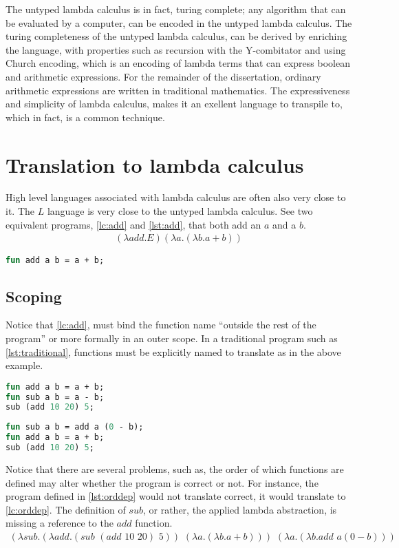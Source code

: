 \documentclass[11pt,oneside,a4paper]{report}
\begin{document}
The untyped lambda calculus is in fact, turing complete; any algorithm that can be evaluated by a computer, can be encoded in the untyped lambda calculus.
The turing completeness of the untyped lambda calculus, can be derived by enriching the language, with properties such as recursion with the Y-combitator and using Church encoding, which is an encoding of lambda terms that can express boolean and arithmetic expressions\cite{church1985calculi}.
For the remainder of the dissertation, ordinary arithmetic expressions are written in traditional mathematics.
The expressiveness and simplicity of lambda calculus, makes it an exellent language to transpile to, which in fact, is a common technique.

\section{Translation to lambda calculus}
High level languages associated with lambda calculus are often also very close to it.
The $L$ language is very close to the untyped lambda calculus.
See two equivalent programs, \autoref{lc:add} and \autoref{lst:add}, that both add an $a$ and a $b$.
\begin{align}
(\lambda add . E)(\lambda a . (\lambda b . a + b))
\label{lc:add}
\end{align}
\begin{lstlisting}[language=ML,caption={Add function},label={lst:add},xleftmargin=.35\textwidth]
fun add a b = a + b;
\end{lstlisting}

\subsection{Scoping}
Notice that \autoref{lc:add}, must bind the function name ``outside the rest of the program'' or more formally in an outer scope.
In a traditional program such as \autoref{lst:traditional}, functions must be explicitly named to translate as in the above example.
\begin{lstlisting}[language=ML,caption={A traditional program},label={lst:traditional},xleftmargin=.32\textwidth]
fun add a b = a + b;
fun sub a b = a - b;
sub (add 10 20) 5;
\end{lstlisting}
\begin{lstlisting}[language=ML,caption={An order dependant program},label={lst:orddep},xleftmargin=.32\textwidth]
fun sub a b = add a (0 - b);
fun add a b = a + b;
sub (add 10 20) 5;
\end{lstlisting}
Notice that there are several problems, such as, the order of which functions are defined may alter whether the program is correct or not.
For instance, the program defined in \autoref{lst:orddep} would not translate correct, it would translate to \autoref{lc:orddep}.
The definition of $sub$, or rather, the applied lambda abstraction, is missing a reference to the $add$ function.
\begin{align}
(\lambda sub . (\lambda add . (sub \,\, (add \,\, 10 \,\, 20) \,\, 5)) \,\, (\lambda a . (\lambda b . a + b))) \,\, (\lambda a . (\lambda b . add \,\, a (0 - b)))
\label{lc:orddep}
\end{align}
\end{document}
